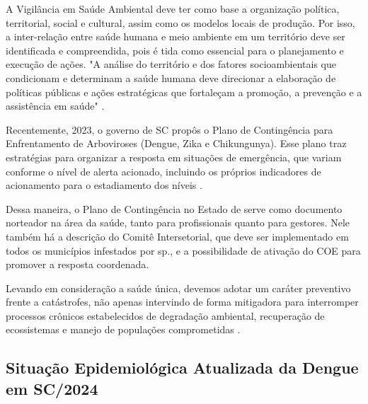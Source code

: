 \indent A Vigilância em Saúde Ambiental deve ter como base a organização política, territorial, social e cultural, assim como os modelos locais de produção. Por isso, a inter-relação entre saúde humana e meio ambiente em um território deve ser identificada e compreendida, pois é tida como essencial para o planejamento e execução de ações. "A análise do território e dos fatores socioambientais que condicionam e determinam a saúde humana deve direcionar a elaboração de políticas públicas e ações estratégicas que fortaleçam a promoção, a prevenção e a assistência em saúde" \cite{GuiaVigSaúde22}.

\indent Recentemente, 2023, o governo de \acrlong{SC} propôs o Plano de Contingência para Enfrentamento de Arboviroses (Dengue, Zika e Chikungunya). Esse plano traz estratégias para organizar a resposta em situações de emergência, que variam conforme o nível de alerta acionado, incluindo os próprios indicadores de acionamento para o estadiamento dos níveis \cite{contingenciaSCdengue}.

\indent Dessa maneira, o Plano de Contingência no Estado de  serve como documento norteador na área da saúde, tanto para profissionais quanto para gestores. Nele também há a descrição do Comitê Intersetorial, que deve ser implementado em todos os municípios infestados por  sp., e a possibilidade de ativação do \acrfull{COE} para promover a resposta coordenada.

\indent Levando em consideração a saúde única, devemos adotar um caráter preventivo frente a catástrofes, não apenas  intervindo de forma mitigadora para interromper processos crônicos estabelecidos de degradação ambiental, recuperação de ecossistemas e manejo de populações comprometidas \cite{Cubas2014Tratado}.

\subsection{Situação Epidemiológica Atualizada da Dengue em SC/2024}

